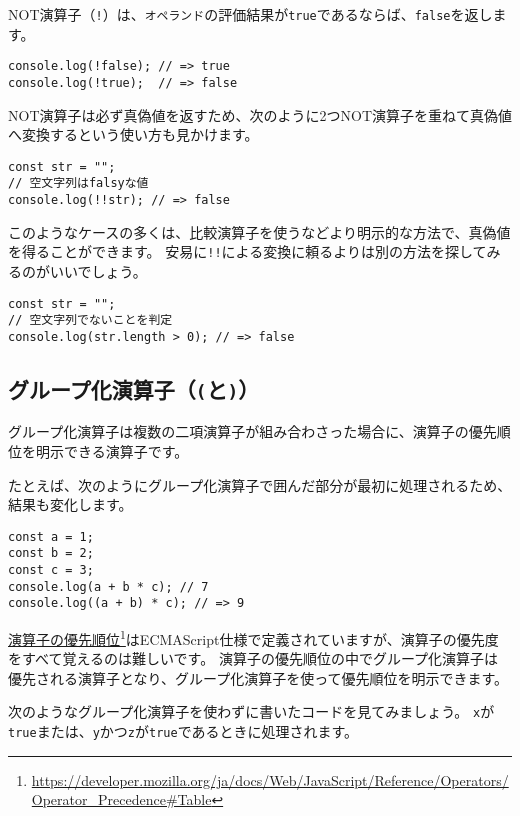 NOT演算子（\texttt{!}）は、\texttt{オペランド}の評価結果が\texttt{true}であるならば、\texttt{false}を返します。

\begin{lstlisting}
console.log(!false); // => true
console.log(!true);  // => false
\end{lstlisting}

NOT演算子は必ず真偽値を返すため、次のように2つNOT演算子を重ねて真偽値へ変換するという使い方も見かけます。

\begin{lstlisting}
const str = "";
// 空文字列はfalsyな値
console.log(!!str); // => false
\end{lstlisting}

このようなケースの多くは、比較演算子を使うなどより明示的な方法で、真偽値を得ることができます。
安易に\texttt{!!}による変換に頼るよりは別の方法を探してみるのがいいでしょう。

\begin{lstlisting}
const str = "";
// 空文字列でないことを判定
console.log(str.length > 0); // => false
\end{lstlisting}

\hypertarget{group-operator}{%
\subsection{\texorpdfstring{グループ化演算子（\texttt{(}と\texttt{)}）}{グループ化演算子（(と)）}}\label{group-operator}}

グループ化演算子は複数の二項演算子が組み合わさった場合に、演算子の優先順位を明示できる演算子です。

たとえば、次のようにグループ化演算子で囲んだ部分が最初に処理されるため、結果も変化します。

\begin{lstlisting}
const a = 1;
const b = 2;
const c = 3;
console.log(a + b * c); // 7
console.log((a + b) * c); // => 9
\end{lstlisting}

\href{https://developer.mozilla.org/ja/docs/Web/JavaScript/Reference/Operators/Operator_Precedence\#Table}{演算子の優先順位}\footnote{\url{https://developer.mozilla.org/ja/docs/Web/JavaScript/Reference/Operators/Operator_Precedence\#Table}}はECMAScript仕様で定義されていますが、演算子の優先度をすべて覚えるのは難しいです。
演算子の優先順位の中でグループ化演算子は優先される演算子となり、グループ化演算子を使って優先順位を明示できます。

次のようなグループ化演算子を使わずに書いたコードを見てみましょう。
\texttt{x}が\texttt{true}または、\texttt{y}かつ\texttt{z}が\texttt{true}であるときに処理されます。

